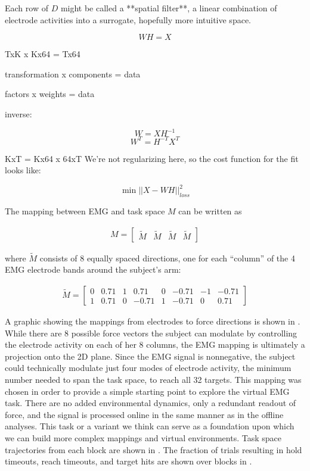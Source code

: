 \documentclass[../main.tex]{subfiles}
\begin{document}
Each row of $D$ might be called a **spatial filter**, a linear combination of electrode activities into a surrogate, hopefully more intuitive space.


$$WH   =  X$$

TxK x Kx64 = Tx64

transformation x components = data

factors x weights = data

inverse:

$$W = XH^{-1}$$
$$W^T = H^{-T}X^T$$

KxT = Kx64 x 64xT
We're not regularizing here, so the cost function for the fit looks like:

$$\min{||X - WH||^{2}_{loss}}$$


The mapping between EMG and task space $M$ can be written as

\begin{align}
M = \begin{bmatrix}\tilde{M} & \tilde{M} & \tilde{M} & \tilde{M}\end{bmatrix}
\end{align}

where $\tilde{M}$ consists of 8 equally spaced directions, one for
each ``column'' of the 4 EMG electrode bands around the subject's arm:

\begin{align}
\tilde{M} =
\begin{bmatrix}
0  & 0.71  & 1   & 0.71   & 0  & -0.71  & -1  & -0.71 \\
1  & 0.71  & 0  & -0.71  & 1   & -0.71   & 0   & 0.71
\end{bmatrix}
\end{align}

A graphic showing the mappings from electrodes to force directions is shown in . While there are 8 possible force vectors the subject can modulate by controlling the electrode activity on each of her 8 columns, the EMG mapping is ultimately a projection onto the 2D plane. Since the EMG signal is nonnegative, the subject could technically modulate just four modes of electrode activity, the minimum number needed to span the task space, to reach all 32 targets. This mapping was chosen in order to provide a simple starting point to explore the virtual EMG task. There are no added environmental dynamics, only a redundant readout of force, and the signal is processed online in the same manner as in the offline analyses. This task or a variant we think can serve as a foundation upon which we can build more complex mappings and virtual environments. Task space trajectories from each block are shown in . The fraction of trials resulting in hold timeouts, reach timeouts, and target hits are shown over blocks in .
\end{document}
